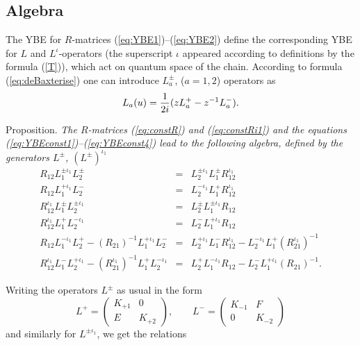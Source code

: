 \documentclass[a4paper,a4paper]{article}
\begin{document}
\subsection{Algebra}

The YBE for $R$-matrices (\ref{eq:YBE1})--(\ref{eq:YBE2}) 
define the corresponding
YBE for $L$ and $L^{\iota}$-operators (the superscript
$\iota$ appeared according to definitions by the formula (\ref{T})), 
which act on quantum space of the chain.
According to formula (\ref{eq:deBaxterise}) one can introduce 
$L_a^{\pm}$,  ($a=1,2$) operators as
\begin{equation}
  \label{L}
  L_a(u)={1 \over 2i}(z L_a^+ - z^{-1} L_a^{-}).
\end{equation}
\medskip

\noindent
{\large \sc Proposition}. 
\textsl{The $R$-matrices (\ref{eq:constR}) 
and (\ref{eq:constRi1}) and the
equations (\ref{eq:YBEconst1})--(\ref{eq:YBEconst4}) lead to the
following algebra, defined by the generators $L^{\pm}$, 
$\left(L^{\pm}\right)^{\iota_1}$
\begin{eqnarray}
  \label{eq:RLL}
  R_{12} L_{1}^{\pm\iota_1} L_{2}^\pm &=&
  L_{2}^{\pm\iota_1} L_{1}^\pm R_{12}^{\iota_1} \\
  R_{12} L_{1}^{+\iota_1} L_{2}^- &=&
  L_{2}^{-\iota_1} L_{1}^+ R_{12}^{\iota_1} \\[3mm]
  R_{12}^{\iota_1} L_{1}^\pm L_{2}^{\pm\iota_1} &=&
  L_{2}^\pm L_{1}^{\pm\iota_1} R_{12} \\
  R_{12}^{\iota_1} L_{1}^+ L_{2}^{-\iota_1} &=&
  L_{2}^- L_{1}^{+\iota_1} R_{12} \\[3mm]
  R_{12} L_{1}^{-\iota_1} L_{2}^{+} 
  - \left(R_{21}\right)^{-1} L_{1}^{+\iota_1} L_{2}^{-} &=&
  L_{2}^{+\iota_1} L_{1}^{-} R_{12}^{\iota_1} 
  - L_{2}^{-\iota_1} L_{1}^{+} \left(R_{21}^{\iota_1}\right)^{-1} \\
  R_{12}^{\iota_1} L_{1}^{-} L_{2}^{+\iota_1} 
  - \left(R_{21}^{\iota_1}\right)^{-1} L_{1}^{+} L_{2}^{-\iota_1} &=&
  L_{2}^{+} L_{1}^{-\iota_1} R_{12} 
  - L_{2}^{-} L_{1}^{+\iota_1} \left(R_{21}\right)^{-1}. 
\end{eqnarray}
}

Writing the operators $L^\pm$  as usual in the form 
\begin{equation}
  \label{eq:Lmatrix}
  L^+ = \left(
    \begin{array}{cc}
      K_{+1} & 0 \\
      E & K_{+2} 
    \end{array}
  \right),
  \qquad
  L^- = \left(
    \begin{array}{cc}
      K_{-1} & F \\
      0 & K_{-2} 
    \end{array}
  \right)
\end{equation}
and similarly for $L^{\pm\iota_1}$, we get the relations
\end{document}
